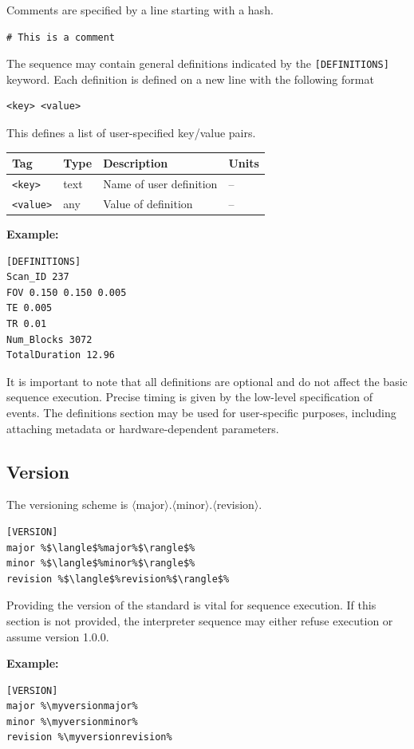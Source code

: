 \documentclass{article}
\def\myversionmajor{1}
\def\myversionminor{3}
\def\myversionrevision{0}
\begin{document}
Comments are specified by a line starting with a hash.
\begin{lstlisting}
# This is a comment
\end{lstlisting}

The sequence may contain general definitions indicated by the \verb.[DEFINITIONS]. keyword. Each definition is defined on a new line with the following format
\begin{lstlisting}
<key> <value>
\end{lstlisting}
This defines a list of user-specified key/value pairs.

\begin{tabularx}{\textwidth}{llXl}
\toprule
Tag & Type & Description & Units\\
\midrule
\verb.<key>. & text & Name of user definition & -- \\
\verb.<value>. & any & Value of definition & -- \\
\bottomrule
\end{tabularx}

\textbf{Example:}
\begin{lstlisting}
[DEFINITIONS]
Scan_ID 237
FOV 0.150 0.150 0.005
TE 0.005
TR 0.01
Num_Blocks 3072
TotalDuration 12.96
\end{lstlisting}
It is important to note that all definitions are optional and do not affect the basic sequence execution. Precise timing is given by the low-level specification of events. The definitions section may be used for user-specific purposes, including attaching metadata or hardware-dependent parameters.

\subsection{Version}

The versioning scheme is $\langle$major$\rangle$.$\langle$minor$\rangle$.$\langle$revision$\rangle$.

\begin{lstlisting}[escapechar=\%]
[VERSION]
major %$\langle$%major%$\rangle$%
minor %$\langle$%minor%$\rangle$%
revision %$\langle$%revision%$\rangle$%
\end{lstlisting}

Providing the version of the standard is vital for sequence execution.
If this section is not provided, the interpreter sequence may either refuse execution or assume version 1.0.0.

\textbf{Example:}
\begin{lstlisting}[escapechar=\%]
[VERSION]
major %\myversionmajor%
minor %\myversionminor%
revision %\myversionrevision%
\end{lstlisting}
\end{document}
